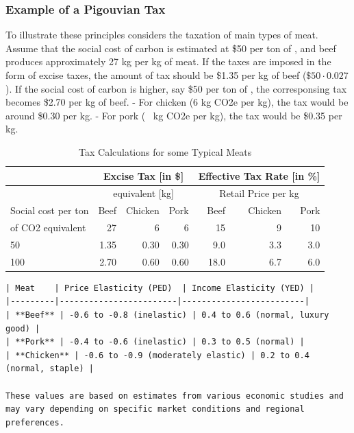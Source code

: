 \documentclass{article}[12pt,letterpaper]
\begin{document}
\subsubsection{Example of a Pigouvian Tax}
To illustrate these principles considers the taxation of main types of meat. Assume that the social cost of carbon is estimated at \$50 per ton of \cadi, and beef produces approximately 27 kg \cadi per kg of meat. If the taxes are imposed in the form of excise taxes, the amount of tax should be \$1.35 per kg of beef ($\$50 \cdot 0.027$). If the social cost of carbon is higher, say \$50 per ton of \cadi, the corresponsing tax becomes \$2.70 per kg of beef. 
- For chicken (6 kg CO2e per kg), the tax would be around \$0.30 per kg.  
- For pork (~ kg CO2e per kg), the tax would be \$0.35 per kg.  

\begin{table}[ht]
    \begin{center}
    \caption{Tax Calculations for some Typical Meats}	
	\begin{tabular}{l|rrr|rrr}
	\hline
	& \multicolumn{3}{c|}{Excise Tax [in \$]} & \multicolumn{3}{c}{Effective Tax Rate [in \%]}                        \\
	\hline
	& \multicolumn{3}{c|}{\cadi equivalent [kg]} & \multicolumn{3}{c}{Retail Price per kg}            \\
	\hline	
	Social cost per ton & Beef & Chicken & Pork & Beef &    Chicken &       Pork \\
	of CO2 equivalent &                  27 &          6 &          6 &                                               15 &          9 &         10 \\
	\hline
					50 &                1.35 &        0.30 &        0.30 &                                             9.0 &   3.3 &       3.0 \\
					100 &               2.70 &        0.60 &        0.60 &                                            18.0 &   6.7 &       6.0 \\
	\hline
	\end{tabular}
\end{center}
\end{table}
	

\begin{verbatim}
| Meat    | Price Elasticity (PED)  | Income Elasticity (YED) |
|---------|------------------------|-------------------------|
| **Beef** | -0.6 to -0.8 (inelastic) | 0.4 to 0.6 (normal, luxury good) |
| **Pork** | -0.4 to -0.6 (inelastic) | 0.3 to 0.5 (normal) |
| **Chicken** | -0.6 to -0.9 (moderately elastic) | 0.2 to 0.4 (normal, staple) |

These values are based on estimates from various economic studies and may vary depending on specific market conditions and regional preferences.
\end{verbatim}
\end{document}
